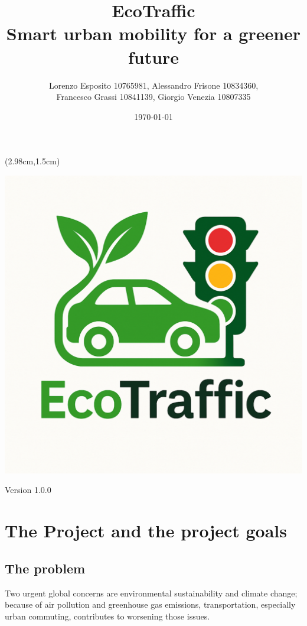 \documentclass[12pt, a4paper, twoside, openright]{report}
\title{\textbf{EcoTraffic}\\Smart urban mobility for a greener future}
\author{Lorenzo Esposito 10765981, Alessandro Frisone 10834360, \\ Francesco Grassi 10841139, Giorgio Venezia 10807335}
\date{\today}
\begin{document}
\begin{textblock*}{\textwidth}(2.98cm,1.5cm)
  \begin{center}
    \includegraphics[scale=0.25]{images/EcoTraffic_logo.pdf}  
    \maketitle
    Version 1.0.0
  \end{center}  
\end{textblock*}


\blankpage

\tableofcontents
\afterpage{\blankpage}
\newpage
{}

\chapter{The Project and the project goals}
\section{The problem}
Two urgent global concerns are environmental sustainability and climate
change; because of air pollution and greenhouse gas emissions,
transportation, especially urban commuting, contributes to worsening
those issues.
\end{document}
